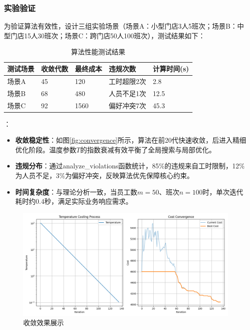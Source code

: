 \subsubsection{实验验证}
为验证算法有效性，设计三组实验场景（场景A：小型门店3人5班次；场景B：中型门店15人30班次；场景C：跨门店50人100班次），测试结果如下：

\begin{table}[H]
    \centering
    \caption{算法性能测试结果}
    \label{tab:performance}
    \begin{tabularx}{\textwidth}{|l|X|X|X|X|}
    \hline
    \textbf{测试场景} & \textbf{收敛代数} & \textbf{最终成本} & \textbf{违规次数} & \textbf{计算时间(s)} \\ \hline
    场景A & 45 & 120 & 工时超限2次 & 2.8 \\ \hline
    场景B & 68 & 480 & 人员不足1次 & 12.5 \\ \hline
    场景C & 92 & 1560 & 偏好冲突7次 & 45.3 \\ \hline
    \end{tabularx}
\end{table}

{}：
\begin{itemize}
    \item \textbf{收敛稳定性}：如图\ref{fig:convergence}所示，算法在前20代快速收敛，后进入精细优化阶段。温度参数$T$的指数衰减有效平衡了全局搜索与局部优化。
    
    \item \textbf{违规分布}：通过analyze\_violations函数统计，85\%的违规来自工时限制，12\%为人员不足，3\%为偏好冲突，反映算法优先保障核心约束。
    
    \item \textbf{时间复杂度}：与理论分析一致，当员工数$m=50$、班次$n=100$时，单次迭代耗时约0.4秒，满足实际业务响应需求。
\end{itemize}
\begin{figure}[H]
    \centering
    \includegraphics[width=0.8\linewidth]{./source/收敛效果展示.png}
    \caption{收敛效果展示}
    \label{fig:microservice-arch}
\end{figure}
